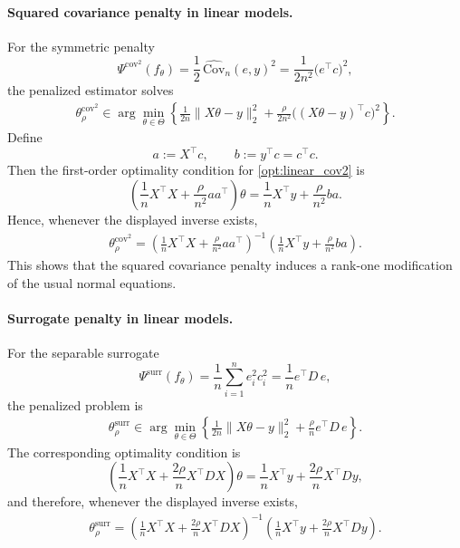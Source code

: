 \documentclass{article}
\theoremstyle{plain}
\theoremstyle{definition}
\newcommand{\1}{\mathbf{1}}
\newcommand{\Cov}{\text{Cov}}
\begin{document}
\paragraph{Squared covariance penalty in linear models.}
For the symmetric penalty
\[
\Psi^{\mathrm{cov}^2}(f_\theta)
=
\frac{1}{2}\,\widehat{\Cov}_n(e,y)^2
=
\frac{1}{2n^2}\bigl(e^\top c\bigr)^2,
\]
the penalized estimator solves
\begin{align}
    \label{opt:linear_cov2}
    \theta_{\rho}^{\mathrm{cov}^2}
    \in
    \arg\min_{\theta\in\Theta}
    \left\{
        \frac{1}{2n}\|X\theta-y\|_2^2
        +
        \frac{\rho}{2n^2}\bigl((X\theta-y)^\top c\bigr)^2
    \right\}.
\end{align}
Define
\[
a := X^\top c,
\qquad
b := y^\top c = c^\top c.
\]
Then the first-order optimality condition for \eqref{opt:linear_cov2} is
\[
\left(
\frac{1}{n}X^\top X + \frac{\rho}{n^2}aa^\top
\right)\theta
=
\frac{1}{n}X^\top y + \frac{\rho}{n^2}ba.
\]
Hence, whenever the displayed inverse exists,
\begin{align}
    \label{eq:linear_cov2_closed_form}
    \theta_{\rho}^{\mathrm{cov}^2}
    =
    \left(
        \frac{1}{n}X^\top X
        +
        \frac{\rho}{n^2}aa^\top
    \right)^{-1}
    \left(
        \frac{1}{n}X^\top y
        +
        \frac{\rho}{n^2}ba
    \right).
\end{align}
This shows that the squared covariance penalty induces a rank-one modification of the usual normal equations.

\paragraph{Surrogate penalty in linear models.}
For the separable surrogate
\[
\Psi^{\mathrm{surr}}(f_\theta)
=
\frac{1}{n}\sum_{i=1}^n e_i^2 c_i^2
=
\frac{1}{n}e^\top D\,e,
\]
the penalized problem is
\begin{align}
    \label{opt:linear_surr}
    \theta_{\rho}^{\mathrm{surr}}
    \in
    \arg\min_{\theta\in\Theta}
    \left\{
        \frac{1}{2n}\|X\theta-y\|_2^2
        +
        \frac{\rho}{n}e^\top D\,e
    \right\}.
\end{align}
The corresponding optimality condition is
\[
\left(
\frac{1}{n}X^\top X
+
\frac{2\rho}{n}X^\top D X
\right)\theta
=
\frac{1}{n}X^\top y
+
\frac{2\rho}{n}X^\top D y,
\]
and therefore, whenever the displayed inverse exists,
\begin{align}
    \label{eq:linear_surr_closed_form}
    \theta_{\rho}^{\mathrm{surr}}
    =
    \left(
        \frac{1}{n}X^\top X
        +
        \frac{2\rho}{n}X^\top D X
    \right)^{-1}
    \left(
        \frac{1}{n}X^\top y
        +
        \frac{2\rho}{n}X^\top D y
    \right).
\end{align}
\end{document}
